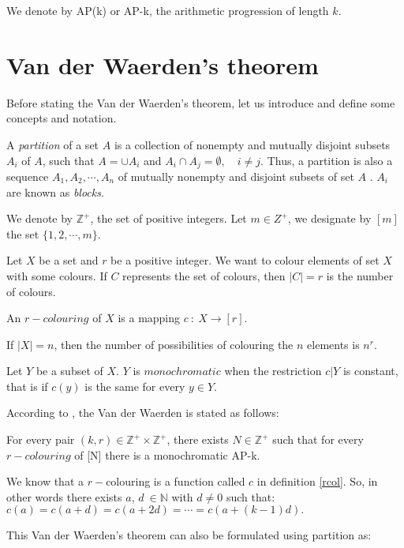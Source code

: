 We denote by AP(k) or AP-k, the arithmetic progression of length $k.$


\section{Van der Waerden's theorem}

Before stating the Van der Waerden's theorem, let us introduce and define some concepts and notation.

A \textit{partition} of a set $A$ is a collection of nonempty and mutually disjoint subsets $A_i$ of $A$, such that  $A=\cup A_i$ and $A_i \cap A_j=\emptyset, \quad i\neq j.$ Thus, a partition is also a sequence $A_1, A_2, \cdots, A_n$ of mutually nonempty and  disjoint subsets of set $A$ \citep{dransfield2004}. $A_i$ are known as \textit{blocks}.

We denote by $\mathbb{Z}^+$, the set of positive integers.
Let $m \in \mathit{Z}^+$, we designate by $[m]$ the set $\{1,2, \cdots, m\}.$

Let $X$ be a set and $r$ be a positive integer. We want to colour elements of set $X$ with some colours. If $C$ represents the set of colours, then $|C|=r$ is the number of colours.

\begin{defn} An $r-colouring$ of $X$ is a mapping $c \ : \ X \longrightarrow [r].$  \label{rcol}\end{defn}

If $|X|=n$, then the number of possibilities of colouring the $n$ elements is $n^r.$

Let $Y$ be a subset of $X.$ $Y$ is $monochromatic$ when the restriction $c|Y$ is constant, that is   if $c(y)$ is the same for every $y \in Y.$

According to \cite{Polymath2009new} , the Van der Waerden is stated as follows:

\begin{thm}
For every pair $(k,r) \in \mathbb{Z}^+ \times \mathbb{Z}^+$, there exists $N \in \mathbb{Z}^+$ such that for
every $r-colouring$ of [N] there is a monochromatic AP-k.  \label{vd1}
\end{thm}

We know that a $r-$colouring is a function called $c$ in definition \eqref{rcol}. So, in other words there exists $a$,  $d \ \in \mathbb{N}$ with $d\neq 0$ such that: $c(a)=c(a+d)=c(a+2d)=\cdots =c(a+(k-1)d).$

This Van der Waerden's theorem can also be formulated using partition \citep{dransfield2004} as:

